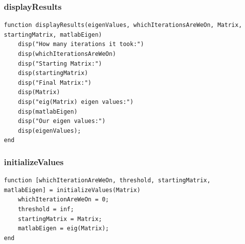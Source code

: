 \newpage
\subsubsection{displayResults}
\begin{simplechar}
\begin{lstlisting}
function displayResults(eigenValues, whichIterationsAreWeOn, Matrix, startingMatrix, matlabEigen)
    disp("How many iterations it took:")
    disp(whichIterationsAreWeOn)
    disp("Starting Matrix:")
    disp(startingMatrix)
    disp("Final Matrix:")
    disp(Matrix)
    disp("eig(Matrix) eigen values:")
    disp(matlabEigen)
    disp("Our eigen values:")
    disp(eigenValues);
end
\end{lstlisting}
\end{simplechar}

\subsubsection{initializeValues}
\begin{simplechar}
\begin{lstlisting}
function [whichIterationAreWeOn, threshold, startingMatrix, matlabEigen] = initializeValues(Matrix)
    whichIterationAreWeOn = 0;
    threshold = inf;
    startingMatrix = Matrix;
    matlabEigen = eig(Matrix);
end
\end{lstlisting}
\end{simplechar}

\newpage
